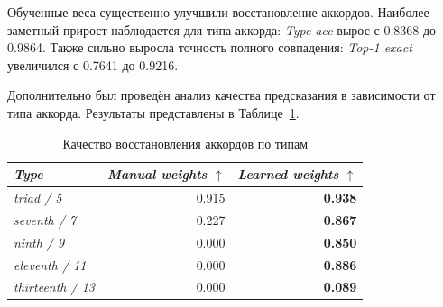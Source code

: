 \documentclass[a4paper,12pt]{extarticle}
\begin{document}
\begin{table}[htbp]
\caption{Сравнение ручного и обучаемого \textit{scoring} для восстановления аккордов из \textit{MIDI}}
\label{tab:chord-prediction-scoring}
\centering
\scriptsize
{}
\end{table}

Обученные веса существенно улучшили восстановление аккордов. Наиболее заметный прирост наблюдается для типа аккорда: \textit{Type acc} вырос с 0.8368 до 0.9864. Также сильно выросла точность полного совпадения: \textit{Top-1 exact} увеличился с 0.7641 до 0.9216.

Дополнительно был проведён анализ качества предсказания в зависимости от типа аккорда. Результаты представлены в Таблице~\ref{tab:chord-type-accuracy}.

\begin{table}[htbp]
\caption{Качество восстановления аккордов по типам}
\label{tab:chord-type-accuracy}
\centering
\footnotesize
\begin{tabular}{@{}lrr@{}}
\toprule
\textit{Type} & \textit{Manual weights} $\uparrow$ & \textit{Learned weights} $\uparrow$ \\
\midrule
\textit{triad / 5} & 0.915 & \textbf{0.938} \\
\textit{seventh / 7} & 0.227 & \textbf{0.867} \\
\textit{ninth / 9} & 0.000 & \textbf{0.850} \\
\textit{eleventh / 11} & 0.000 & \textbf{0.886} \\
\textit{thirteenth / 13} & 0.000 & \textbf{0.089} \\
\bottomrule
\end{tabular}
\end{table}
\end{document}

